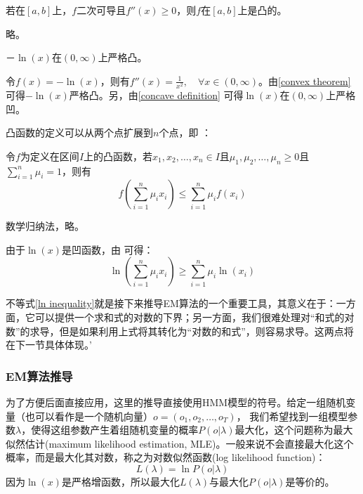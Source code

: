 \documentclass[11pt,a4paper]{article}
\numberwithin{equation}{section}
\renewenvironment{proof}{{\noindent \textbf{证明}}}{}
\begin{document}
\begin{theorem}\label{convex theorem}
若在$ [a, b] $上，$ f $二次可导且$ f''(x) \ge 0 $，则$ f $在$ [a, b] $上是凸的。
\end{theorem}

\begin{proof}
略。
\end{proof}

\begin{proposition}\label{ln proposition}
$ －\ln(x) $在$ (0, \infty) $上严格凸。
\end{proposition}

\begin{proof}
令$ f(x) = -\ln(x) $，则有$ f''(x) = \frac{1}{x^2}, \quad \forall x \in (0, \infty) $。由\autoref{convex theorem} 可得$ -\ln(x) $严格凸。另，由\autoref{concave definition} 可得$ \ln(x) $在$ (0, \infty) $上严格凹。
\end{proof}

凸函数的定义可以从两个点扩展到$ n $个点，即  ：

\begin{theorem}[Jensen不等式]\label{n points convex}
令$ f $为定义在区间$ I $上的凸函数，若$ x_1, x_2, \ldots, x_n \in I $且$ \mu_1, \mu_2, \ldots, \mu_n \ge 0 $且$ \sum_{i = 1}^n \mu_i = 1 $，则有
\begin{equation*}
f(\sum_{i = 1}^n \mu_i x_i) \le \sum_{i = 1}^n \mu_i f(x_i)
\end{equation*}
\end{theorem}

\begin{proof}
数学归纳法，略。
\end{proof}

由于$ \ln(x) $是凹函数，由 可得：
\begin{equation}\label{ln inequality}
\ln(\sum_{i = 1}^n \mu_i x_i) \ge \sum_{i = 1}^n \mu_i \ln(x_i)
\end{equation}

不等式\eqref{ln inequality}就是接下来推导EM算法的一个重要工具，其意义在于：一方面，它可以提供一个求和式的对数的下界；另一方面，我们很难处理对“和式的对数”的求导，但是如果利用上式将其转化为“对数的和式”，则容易求导。这两点将在下一节具体体现。'

\subsubsection{EM算法推导}

为了方便后面直接应用，这里的推导直接使用HMM模型的符号。给定一组随机变量（也可以看作是一个随机向量）$ o = (o_1, o_2, \ldots, o_T) $， 我们希望找到一组模型参数$ \lambda $，使得这组参数产生着组随机变量的概率$ P(o | \lambda) $最大化，这个问题称为最大似然估计(maximum likelihood estimation, MLE)。一般来说不会直接最大化这个概率，而是最大化其对数，称之为对数似然函数(log likelihood function)：
\begin{equation}\label{log likelihood function}
L(\lambda) = \ln P(o | \lambda)
\end{equation}
因为$ \ln(x) $是严格增函数，所以最大化$ L(\lambda) $与最大化$ P(o | \lambda) $是等价的。
\end{document}
